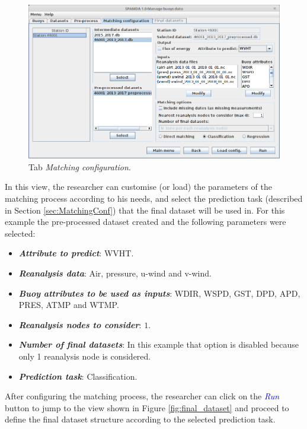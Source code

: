 \begin{onehalfspace}
			\begin{figure}[ht!]
				\centering
				\includegraphics[scale=0.40]{figures/tabMatchingConfiguration_CS.png}
				\caption{Tab \textit{Matching configuration}.}\label{fig:matching_conf}
			\end{figure}
			
			In this view, the researcher can customise (or load) the parameters of the matching process according to his needs, and select the prediction task (described in Section \ref{sec:MatchingConf}) that the final dataset will be used in. For this example the pre-processed dataset created and the following parameters were selected:
			\begin{itemize}
				\setlength\itemsep{0.01cm}
				\item \textit{\textbf{Attribute to predict}}: WVHT.
				\item \textit{\textbf{Reanalysis data}}: Air, pressure, u-wind and v-wind.
				\item \textit{\textbf{Buoy attributes to be used as inputs}}: WDIR, WSPD, GST, DPD, APD, PRES, ATMP and WTMP.
				\item \textit{\textbf{Reanalysis nodes to consider}}: $1$.
				\item \textit{\textbf{Number of final datasets}}: In this example that option is disabled because only 1 reanalysis node is considered.
				\item \textit{\textbf{Prediction task}}: Classification.
			\end{itemize} 

			After configuring the matching process, the researcher can click on the \textcolor{blue}{\textit{Run}} button to jump to the view shown in Figure \ref{fig:final_dataset} and proceed to define the final dataset structure according to the selected prediction task.
			

\end{onehalfspace}
